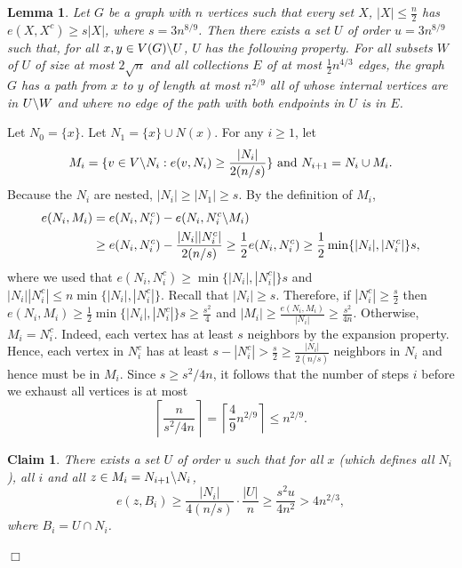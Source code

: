 \documentclass[11pt]{article}
\newtheorem{lemma}[theorem]{Lemma}
\newtheorem{claim}{Claim}
\newenvironment{proof}
      {\medskip\noindent{\bf Proof:}\hspace{1mm}}
      {\hfill$\Box$\medskip}
\begin{document}
\begin{lemma}\label{lem:randomsub}
Let $G$ be a graph with $n$ vertices such that every set $X$, $|X| \leq \frac{n}{2}$ has $e(X, X^c) \geq s |X|$, where $s = 3 n^{8/9}$. Then there exists a set $U$ of order $u = 3 n^{8/9}$ such that, for all $x, y \in V(G) \char92 U$, $U$ has the following property. For all subsets $W$ of $U$ of size at most $2\sqrt{n}$ and all collections $E$ of at most $\frac{1}{2} n^{4/3}$ edges, the graph $G$ has a path from $x$ to $y$ of length at most $n^{2/9}$ all of whose internal vertices are in $U \char92 W$ and where no edge of the path with both endpoints in $U$ is in $E$.
\end{lemma}

\begin{proof}
Let $N_0 =  \{x\}$. Let $N_1 = \{x\} \cup N(x)$. For any $i \geq 1$, let
\[M_i = \{ v \in V\char92 N_i : e(v, N_i) \geq \frac{|N_i|}{2 (n/s)}\} \mbox{ and } N_{i+1} = N_i \cup M_i.\]
Because the $N_i$ are nested, $|N_i| \geq |N_1| \geq s$.
By the definition of $M_i$,
\begin{align*}
e(N_i, M_i) & = e(N_i, N_i^c) - e(N_i, N_i^c \char92 M_i) \\
& \geq e(N_i, N_i^c) - \frac{|N_i| |N_i^c|}{2 (n/s)} \geq \frac{1}{2} e(N_i, N_i^c) \geq \frac{1}{2} \min\{|N_i|, |N_i^c|\} s,
\end{align*}
where we used that $e(N_i, N_i^c) \geq \min\{|N_i|, |N_i^c|\} s$ and $|N_i||N_i^c| \leq n \min\{|N_i|, |N_i^c|\}$.
Recall that $|N_i| \geq s$. Therefore, if $|N_i^c| \geq \frac{s}{2}$ then $e(N_i, M_i) \geq \frac{1}{2} \min\{|N_i|, |N_i^c|\} s \geq \frac{s^2}{4}$ and $|M_i| \geq \frac{e(N_i, M_i)}{|N_i|} \geq \frac{s^2}{4n}$. Otherwise, $M_i = N_i^c$. Indeed, each vertex has at least $s$ neighbors by the expansion property. Hence, each vertex in $N_i^c$ has at least $s - |N_i^c| > \frac{s}{2} \geq \frac{|N_i|}{2 (n/s)}$ neighbors in $N_i$ and hence must be in $M_i$. Since $s \geq s^2/4n$, it follows that the number of steps $i$ before we exhaust all vertices is at most
\[\left\lceil \frac{n}{s^2/4n} \right\rceil = \left\lceil \frac{4}{9} n^{2/9}\right\rceil \leq n^{2/9}.\]

\begin{claim}
There exists a set $U$ of order $u$ such that for all $x$ (which defines all $N_i$), all $i$ and all $z \in M_i = N_{i+1}\char92 N_i$,
\[e(z, B_i) \geq \frac{|N_i|}{4 (n/s)} \cdot \frac{|U|}{n} \geq \frac{s^2 u}{4 n^2} > 4 n^{2/3},\]
where $B_i = U \cap N_i$.
\end{claim}


\end{proof}
\end{document}
